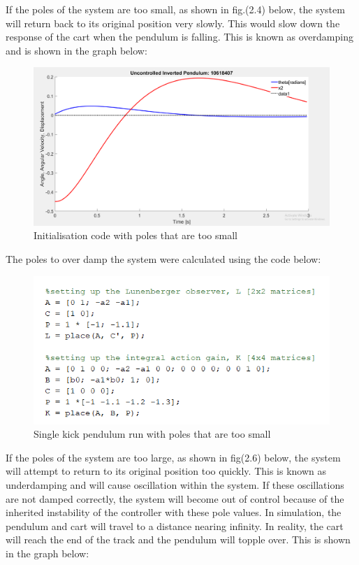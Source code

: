 \documentclass[11pt]{report}
\begin{document}
If the poles of the system are too small, as shown in fig.(2.4) below, the system will return back to its original position very slowly. This would slow down the response of the cart when the pendulum is falling. This is known as overdamping and is shown in the graph below:

\begin{figure}[H]
\centerline{\includegraphics[width=12cm]{polesTooSmall.png}}
\caption{Initialisation code with poles that are too small}
\label{fig}
\end{figure}  

The poles to over damp the system were calculated using the code below:

\begin{figure}[H]
\centerline{\includegraphics[width=12cm]{polesTooSmallCode.png}}
\caption{Single kick pendulum run with poles that are too small}
\label{fig}
\end{figure}  


If the poles of the system are too large, as shown in fig(2.6) below, the system will attempt to return to its original position too quickly. This is known as underdamping and will cause oscillation within the system. If these oscillations are not damped correctly, the system will become out of control because of the inherited instability of the controller with these pole values. In simulation, the pendulum and cart will travel to a distance nearing infinity. In reality, the cart will reach the end of the track and the pendulum will topple over. This is shown in the graph below:
\end{document}

